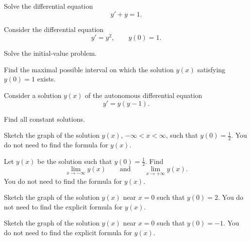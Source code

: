 \documentclass[11pt,oneside]{article}
\begin{document}
\begin{problem}
Solve the differential equation
\[
y'+y=1.
\]
\end{problem}

\begin{problem}
Consider the differential equation
\[
y'=y^2,
\qquad
y(0)=1.
\]
\begin{problemsubparts}
\item Solve the initial-value problem.
\item Find the maximal possible interval on which the solution $y(x)$ satisfying $y(0)=1$ exists.
\end{problemsubparts}
\end{problem}

\begin{problem}
Consider a solution $y(x)$ of the autonomous differential equation
\[
y'=y(y-1).
\]
\begin{problemsubparts}
\item Find all constant solutions.
\item Sketch the graph of the solution $y(x)$, $-\infty<x<\infty$, such that $y(0)=\frac12$. You do not need to find the formula for $y(x)$.
\item Let $y(x)$ be the solution such that $y(0)=\frac12$. Find
\[
\lim_{x\to-\infty}y(x)
\qquad\text{and}\qquad
\lim_{x\to+\infty}y(x).
\]
You do not need to find the formula for $y(x)$.
\item Sketch the graph of the solution $y(x)$ near $x=0$ such that $y(0)=2$. You do not need to find the explicit formula for $y(x)$.
\item Sketch the graph of the solution $y(x)$ near $x=0$ such that $y(0)=-1$. You do not need to find the explicit formula for $y(x)$.
\end{problemsubparts}
\end{problem}
\end{document}

